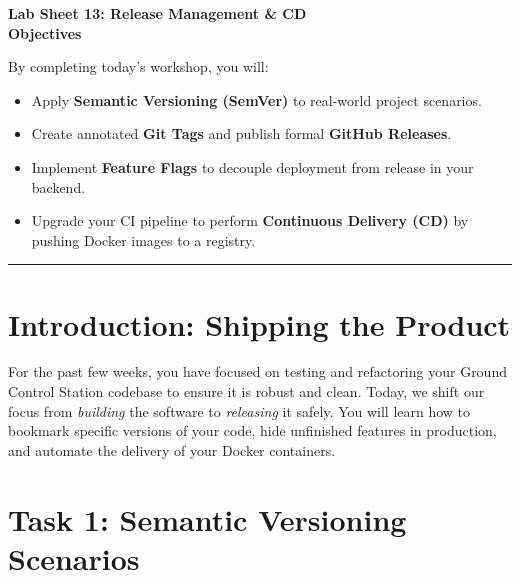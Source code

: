 \documentclass[a4paper,12pt]{article}
\begin{document}

\begin{center}
    \LARGE \textbf{Lab Sheet 13: Release Management \& CD} \\
    \vspace{0.5cm}
    \large \textbf{Objectives}
\end{center}

\noindent By completing today's workshop, you will:
\begin{itemize}
    \item Apply \textbf{Semantic Versioning (SemVer)} to real-world project scenarios.
    \item Create annotated \textbf{Git Tags} and publish formal \textbf{GitHub Releases}.
    \item Implement \textbf{Feature Flags} to decouple deployment from release in your backend.
    \item Upgrade your CI pipeline to perform \textbf{Continuous Delivery (CD)} by pushing Docker images to a registry.
\end{itemize}

\vspace{0.5cm}
\hrule
\vspace{0.5cm}

\section*{Introduction: Shipping the Product}
For the past few weeks, you have focused on testing and refactoring your Ground Control Station codebase to ensure it is robust and clean. Today, we shift our focus from \textit{building} the software to \textit{releasing} it safely. You will learn how to bookmark specific versions of your code, hide unfinished features in production, and automate the delivery of your Docker containers.


\section*{Task 1: Semantic Versioning Scenarios}
\end{document}
